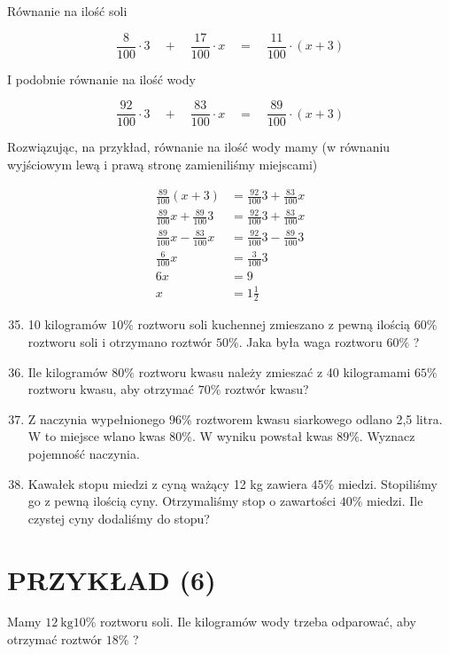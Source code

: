 \documentclass[10pt]{article}
\begin{document}
Równanie na ilość soli

\[
\frac{8}{100} \cdot 3 \quad+\quad \frac{17}{100} \cdot x \quad=\quad \frac{11}{100} \cdot(x+3)
\]

I podobnie równanie na ilość wody

\[
\frac{92}{100} \cdot 3 \quad+\quad \frac{83}{100} \cdot x \quad=\quad \frac{89}{100} \cdot(x+3)
\]

Rozwiązując, na przykład, równanie na ilość wody mamy (w równaniu wyjściowym lewą i prawą stronę zamieniliśmy miejscami)

\[
\begin{aligned}
\frac{89}{100}(x+3) & =\frac{92}{100} 3+\frac{83}{100} x \\
\frac{89}{100} x+\frac{89}{100} 3 & =\frac{92}{100} 3+\frac{83}{100} x \\
\frac{89}{100} x-\frac{83}{100} x & =\frac{92}{100} 3-\frac{89}{100} 3 \\
\frac{6}{100} x & =\frac{3}{100} 3 \\
6 x & =9 \\
x & =1 \frac{1}{2}
\end{aligned}
\]

\begin{enumerate}
  \setcounter{enumi}{34}
  \item 10 kilogramów \(10 \%\) roztworu soli kuchennej zmieszano z pewną ilością \(60 \%\) roztworu soli i otrzymano roztwór \(50 \%\). Jaka była waga roztworu \(60 \%\) ?
  \item Ile kilogramów \(80 \%\) roztworu kwasu należy zmieszać z 40 kilogramami \(65 \%\) roztworu kwasu, aby otrzymać \(70 \%\) roztwór kwasu?
  \item Z naczynia wypełnionego \(96 \%\) roztworem kwasu siarkowego odlano 2,5 litra. W to miejsce wlano kwas \(80 \%\). W wyniku powstał kwas \(89 \%\). Wyznacz pojemność naczynia.
  \item Kawałek stopu miedzi z cyną ważący 12 kg zawiera \(45 \%\) miedzi. Stopiliśmy go z pewną ilością cyny. Otrzymaliśmy stop o zawartości \(40 \%\) miedzi. Ile czystej cyny dodaliśmy do stopu?
\end{enumerate}

\section*{PRZYKŁAD (6)}
Mamy \(12 \mathrm{~kg} 10 \%\) roztworu soli. Ile kilogramów wody trzeba odparować, aby otrzymać roztwór \(18 \%\) ?
\end{document}
